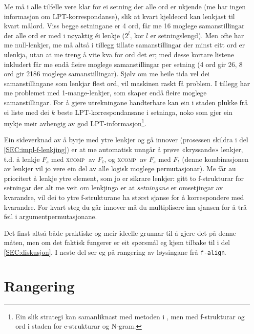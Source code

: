 \documentclass[12pt,a4paper,oneside,draft]{report}
\newcommand{\F}[2]{\textsc{#1}\ensuremath{_{#2}}}
\newcommand{\XCOMPs}{\F{xcomp~}{}}
\begin{document}
Me må i alle tilfelle vere klar for ei setning der alle ord er ukjende
 (me har ingen informasjon om LPT-korrespondanse), slik at kvart
 kjeldeord kan lenkjast til kvart målord. Viss begge setningane er 4
 ord, får me 16 moglege samanstillingar der alle ord er med i nøyaktig
 éi lenkje ($2^l$, kor $l$ er setningslengd). Men ofte har me
 null-lenkjer, me må altså i tillegg tillate samanstillingar der minst
 eitt ord er ulenkja, utan at me treng å vite kva for ord det er; med
 desse kortare listene inkludert får me endå fleire moglege
 samanstillingar per setning (4 ord gir 26, 8 ord gir 2186 moglege
 samanstillingar). Sjølv om me heile tida vel dei samanstillingane som
 lenkjar flest ord, vil maskinen raskt få problem. I tillegg har me
 problemet med 1-mange-lenkjer, som skaper endå fleire moglege
 samanstillingar. For å gjere utrekningane handterbare kan ein i
 staden plukke frå ei liste med dei $k$ beste LPT-korrespondansane i
 setninga, noko som gjer ein mykje meir avhengig av god
 LPT-informasjon\footnote{Ein slik strategi kan samanliknast med metoden i
        \citet{samuelsson2007apa}, men med f-strukturar og ord i
        staden for c-strukturar og N-gram. }.

Ein sideverknad av å byrje med ytre lenkjer og gå innover (prosessen
 skildra i del \ref{SEC:impl-f-lenkjing}) er at me automatisk unngår å
 prøve «kryssande» lenkjer, t.d. å lenkje $F_s$ med \XCOMPs av $F_t$,
 og \XCOMPs av $F_s$ med $F_t$ (denne kombinasjonen av lenkjer vil jo
 vere ein del av alle logisk moglege permutasjonar). Me får au
 prioritert å lenkje ytre element, som jo er sikrare lenkjer: gitt to
 f-strukturar for setningar der alt me veit om lenkjinga er at
 \emph{setningane} er omsetjingar av kvarandre, vil dei to ytre
 f-strukturane ha størst sjanse for å korrespondere med kvarandre. For
 kvart steg du går innover må du multiplisere inn sjansen for å trå
 feil i argumentpermutasjonane.

Det finst altså både praktiske og meir ideelle grunnar til å gjere det
 på denne måten, men om det faktisk fungerer er eit spørsmål eg kjem
 tilbake til i del \ref{SEC:diskusjon}. I neste del ser eg på
 rangering av løysingane frå \texttt{f-align}.

\section{Rangering}
\label{sec-4.2}

\label{SEC:impl-f-rangering}
\end{document}
